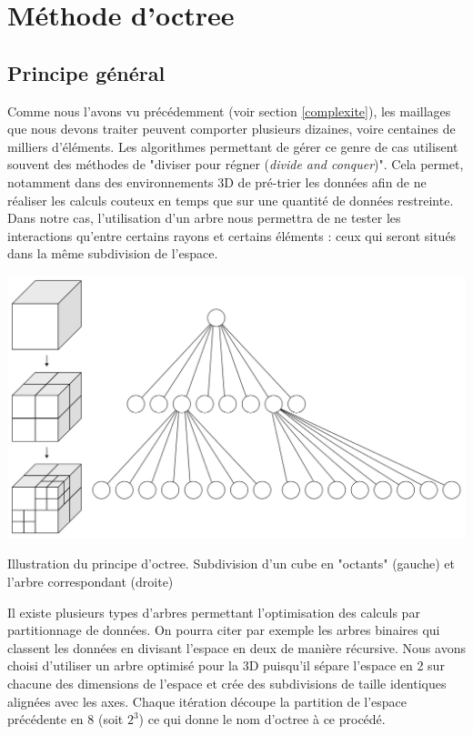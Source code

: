 \section{Méthode d'octree}
\subsection{Principe général} \label{sect_octree_gene}

Comme nous l'avons vu précédemment (voir section \ref{complexite}), les maillages que nous devons traiter peuvent comporter plusieurs dizaines, voire centaines de milliers d'éléments. Les algorithmes permettant de gérer ce genre de cas utilisent souvent des méthodes de "diviser pour régner (\textit{divide and conquer})". Cela permet, notamment dans des environnements 3D de pré-trier les données afin de ne réaliser les calculs couteux en temps que sur une quantité de données restreinte. Dans notre cas, l'utilisation d'un arbre nous permettra de ne tester les interactions qu'entre certains rayons et certains éléments : ceux qui seront situés dans la même subdivision de l'espace. 

\begin{figureth}
	\includegraphics[width=0.6\linewidth]{images/octree}
	\caption{Illustration du principe d'\gls{octree}. Subdivision d'un cube en "octants" (gauche) et l'arbre correspondant (droite)}
	\label{octree}
\end{figureth}

Il existe plusieurs types d'arbres permettant l'optimisation des calculs par partitionnage de données. On pourra citer par exemple les arbres binaires qui classent les données en divisant l'espace en deux de manière récursive. Nous avons choisi d'utiliser un arbre optimisé pour la 3D puisqu'il sépare l'espace en 2 sur chacune des dimensions de l'espace et crée des subdivisions de taille identiques alignées avec les axes. Chaque itération découpe la partition de l'espace précédente en 8 (soit $2^3$) ce qui donne le nom d'\gls{octree} à ce procédé.

